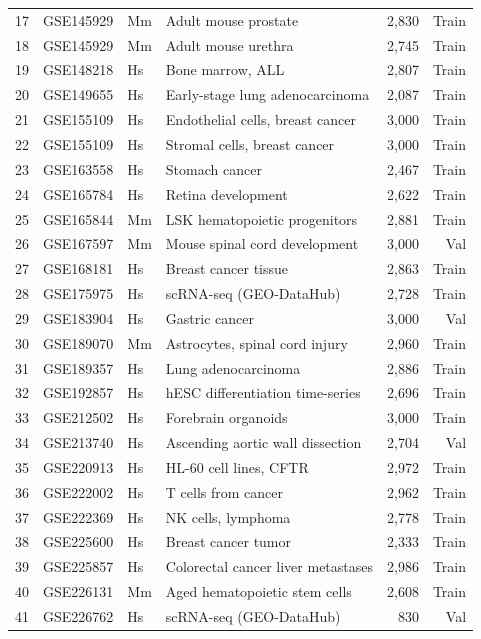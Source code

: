 \documentclass[fleqn,10pt,lineno]{wlpeerj}
\begin{document}
{\begin{longtable}{rllp{4.2cm}rr}
  17 & GSE145929 & Mm & Adult mouse prostate & 2,830 & Train \\
  18 & GSE145929 & Mm & Adult mouse urethra & 2,745 & Train \\
  19 & GSE148218 & Hs & Bone marrow, ALL & 2,807 & Train \\
  20 & GSE149655 & Hs & Early-stage lung adenocarcinoma & 2,087 & Train \\
  21 & GSE155109 & Hs & Endothelial cells, breast cancer & 3,000 & Train \\
  22 & GSE155109 & Hs & Stromal cells, breast cancer & 3,000 & Train \\
  23 & GSE163558 & Hs & Stomach cancer & 2,467 & Train \\
  24 & GSE165784 & Hs & Retina development & 2,622 & Train \\
  25 & GSE165844 & Mm & LSK hematopoietic progenitors & 2,881 & Train \\
  26 & GSE167597 & Mm & Mouse spinal cord development & 3,000 & Val \\
  27 & GSE168181 & Hs & Breast cancer tissue & 2,863 & Train \\
  28 & GSE175975 & Hs & scRNA-seq (GEO-DataHub) & 2,728 & Train \\
  29 & GSE183904 & Hs & Gastric cancer & 3,000 & Val \\
  30 & GSE189070 & Mm & Astrocytes, spinal cord injury & 2,960 & Train \\
  31 & GSE189357 & Hs & Lung adenocarcinoma & 2,886 & Train \\
  32 & GSE192857 & Hs & hESC differentiation time-series & 2,696 & Train \\
  33 & GSE212502 & Hs & Forebrain organoids & 3,000 & Train \\
  34 & GSE213740 & Hs & Ascending aortic wall dissection & 2,704 & Val \\
  35 & GSE220913 & Hs & HL-60 cell lines, CFTR & 2,972 & Train \\
  36 & GSE222002 & Hs & T cells from cancer & 2,962 & Train \\
  37 & GSE222369 & Hs & NK cells, lymphoma & 2,778 & Train \\
  38 & GSE225600 & Hs & Breast cancer tumor & 2,333 & Train \\
  39 & GSE225857 & Hs & Colorectal cancer liver metastases & 2,986 & Train \\
  40 & GSE226131 & Mm & Aged hematopoietic stem cells & 2,608 & Train \\
  41 & GSE226762 & Hs & scRNA-seq (GEO-DataHub) & 830 & Val \\

\end{longtable}}
\end{document}
